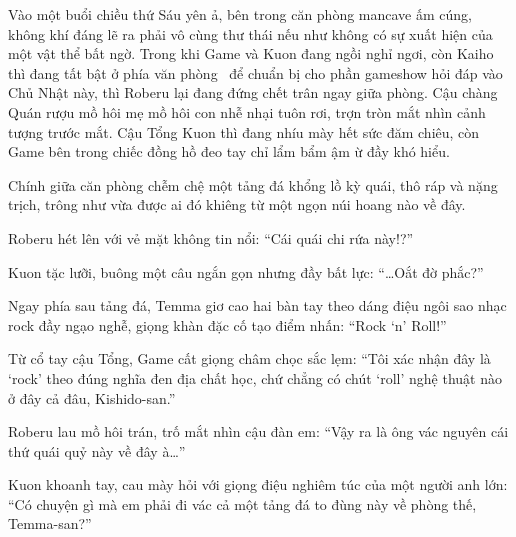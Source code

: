 \documentclass[../main.tex]{subfiles}
\begin{document}

Vào một buổi chiều thứ Sáu yên ả, bên trong căn phòng mancave ấm cúng, không khí đáng lẽ ra phải vô cùng thư thái nếu như không có sự xuất hiện của một vật thể bất ngờ. Trong khi Game và Kuon đang ngồi nghỉ ngơi, còn Kaiho thì đang tất bật ở phía văn phòng \hll\ để chuẩn bị cho phần gameshow hỏi đáp vào Chủ Nhật này, thì Roberu lại đang đứng chết trân ngay giữa phòng. Cậu chàng Quán rượu mồ hôi mẹ mồ hôi con nhễ nhại tuôn rơi, trợn tròn mắt nhìn cảnh tượng trước mắt. Cậu Tổng Kuon thì đang nhíu mày hết sức đăm chiêu, còn Game bên trong chiếc đồng hồ đeo tay chỉ lẩm bẩm ậm ừ đầy khó hiểu.

Chính giữa căn phòng chễm chệ một tảng đá khổng lồ kỳ quái, thô ráp và nặng trịch, trông như vừa được ai đó khiêng từ một ngọn núi hoang nào về đây.


Roberu hét lên với vẻ mặt không tin nổi: ``Cái quái chi rứa này!?''

Kuon tặc lưỡi, buông một câu ngắn gọn nhưng đầy bất lực: ``\dots Oắt đờ phắc?''

Ngay phía sau tảng đá, Temma giơ cao hai bàn tay theo dáng điệu ngôi sao nhạc rock đầy ngạo nghễ, giọng khàn đặc cố tạo điểm nhấn: ``Rock `n' Roll!''

Từ cổ tay cậu Tổng, Game cất giọng châm chọc sắc lẹm: ``Tôi xác nhận đây là `rock' theo đúng nghĩa đen địa chất học, chứ chẳng có chút `roll' nghệ thuật nào ở đây cả đâu, Kishido-san.''

Roberu lau mồ hôi trán, trố mắt nhìn cậu đàn em: ``Vậy ra là ông vác nguyên cái thứ quái quỷ này về đây à\dots''

Kuon khoanh tay, cau mày hỏi với giọng điệu nghiêm túc của một người anh lớn: ``Có chuyện gì mà em phải đi vác cả một tảng đá to đùng này về phòng thế, Temma-san?''
\end{document}
